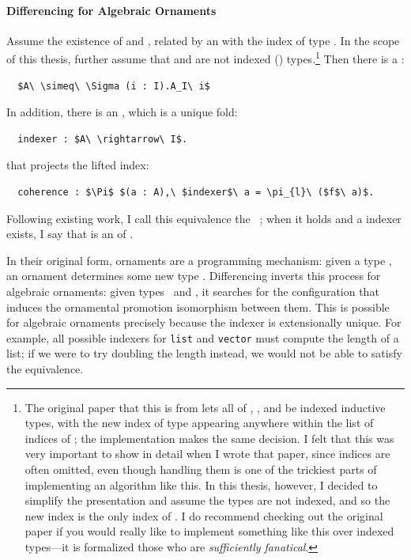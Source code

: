 \paragraph{Differencing for Algebraic Ornaments}
Assume the existence of  \Aa and \AI, related by an  with the index of type \I.
In the scope of this thesis, further assume that \Aa and \I are not indexed () types.\footnote{The original paper that this is from lets all of \Aa,
\AI, and \I be indexed inductive types, with the new index of type \I appearing anywhere within the list of indices of \AI;
the implementation makes the same decision.
I felt that this was very important to show in detail when I wrote that paper, since indices are often omitted,
even though handling them is one of the trickiest parts of implementing an algorithm like this.
In this thesis, however, I decided to simplify the presentation and assume the types are not indexed,
and so the new index is the only index of \AI.
I do recommend checking out the original paper if you would really like to implement something like this over indexed types---it is formalized
those who are \textit{sufficiently fanatical}.}
Then there is a :

\begin{lstlisting}
  $A\ \simeq\ \Sigma (i : I).A_I\ i$
\end{lstlisting}
In addition, there is an , which is a unique fold:

\begin{lstlisting}
  indexer : $A\ \rightarrow\ I$.
\end{lstlisting}
that projects the lifted index:

\begin{lstlisting}
  coherence : $\Pi$ $(a : A),\ $indexer$\ a = \pi_{l}\ ($f$\ a)$.
\end{lstlisting}
Following existing work, I call this equivalence the ~\cite{ko2016programming}; 
when it holds and a  indexer exists, I say that \AI is an  of \Aa.

In their original form, ornaments are a programming mechanism: given a type \Aa, an ornament determines
some new type \AI. Differencing inverts this process for algebraic ornaments: given types \Aa\ and \AI, 
it searches for the configuration that induces the ornamental promotion isomorphism between them.
This is possible for algebraic ornaments precisely because the indexer is extensionally unique.
For example, all possible indexers for \lstinline{list} and \lstinline{vector} must compute
the length of a list; if we were to try doubling the length instead, we would not be able to satisfy the equivalence.

